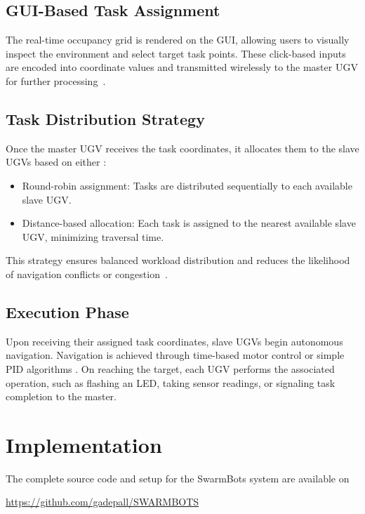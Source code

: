 \documentclass[conference]{IEEEtran}
\begin{document}
\subsection{GUI-Based Task Assignment}
The real-time occupancy grid is rendered on the GUI, allowing users to visually inspect the environment and select target task points. These click-based inputs are encoded into coordinate values and transmitted wirelessly to the master UGV for further processing~\cite{espnowguide}.

\subsection{Task Distribution Strategy}
Once the master UGV receives the task coordinates, it allocates them to the slave UGVs based on either \cite{}:

\begin{itemize}
    \item Round-robin assignment: Tasks are distributed sequentially to each available slave UGV.
    \item Distance-based allocation: Each task is assigned to the nearest available slave UGV, minimizing traversal time.
\end{itemize}

This strategy ensures balanced workload distribution and reduces the likelihood of navigation conflicts or congestion~\cite{jin2024multi}.

\subsection{Execution Phase}
Upon receiving their assigned task coordinates, slave UGVs begin autonomous navigation. Navigation is achieved through time-based motor control \cite{} or simple PID algorithms \cite{}.
On reaching the target, each UGV performs the associated operation, such as flashing an LED, taking sensor readings, or signaling task completion to the master.


\section{Implementation}
\label{sec:Implementation}

The complete source code and setup for the SwarmBots system are available on 
\begin{center}
  \url{https://github.com/gadepall/SWARMBOTS}
\end{center}
\end{document}
